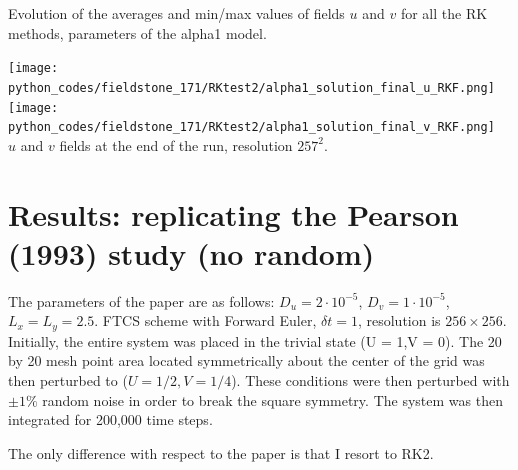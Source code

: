 \begin{center}
{\captionfont Evolution of the averages and min/max values of fields $u$
and $v$ for all the RK methods, parameters of the alpha1 model.}
\end{center}

\begin{center}
\texttt{[image: python\_codes/fieldstone\_171/RKtest2/alpha1\_solution\_final\_u\_RKF.png]}
\texttt{[image: python\_codes/fieldstone\_171/RKtest2/alpha1\_solution\_final\_v\_RKF.png]}\\
{\captionfont $u$ and $v$ fields at the end of the run, resolution $257^2$.}
\end{center}


\newpage
\section*{Results: replicating the Pearson (1993) study (no random)}

The parameters of the paper are as follows: $D_u=2\cdot 10^{-5}$, $D_v=1\cdot 10^{-5}$,
$L_x=L_y=2.5$. FTCS scheme with Forward Euler, $\delta t=1$, 
resolution is $256 \times 256$.
Initially, the entire system was placed in
the trivial state (U = 1,V = 0). The 20 by 20 mesh point area located symmetrically
about the center of the grid was then
perturbed to ($U = 1/2,V = 1/4$). These
conditions were then perturbed with $\pm 1\%$
random noise in order to break the square
symmetry. The system was then integrated for 200,000 time steps.

The only difference with respect to the paper is that I resort to RK2.

